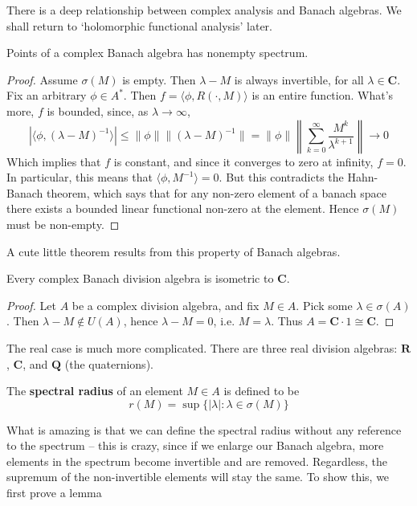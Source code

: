 There is a deep relationship between complex analysis and Banach algebras. We shall return to `holomorphic functional analysis' later.

\begin{theorem}
    Points of a complex Banach algebra has nonempty spectrum.
\end{theorem}
\begin{proof}
    Assume $\sigma(M)$ is empty. Then $\lambda - M$ is always invertible, for all $\lambda \in \mathbf{C}$. Fix an arbitrary $\phi \in A^*$. Then $f = \langle \phi, R(\cdot, M) \rangle$ is an entire function. What's more, $f$ is bounded, since, as $\lambda \to \infty$,
    \[ | \langle \phi, (\lambda - M)^{-1} \rangle | \leq \| \phi \| \| (\lambda - M)^{-1} \| = \| \phi \| \left\| \sum_{k = 0}^\infty \frac{M^k}{\lambda^{k+1}} \right\| \to 0 \]
    Which implies that $f$ is constant, and since it converges to zero at infinity, $f = 0$. In particular, this means that $\langle \phi, M^{-1} \rangle = 0$. But this contradicts the Hahn-Banach theorem, which says that for any non-zero element of a banach space there exists a bounded linear functional non-zero at the element. Hence $\sigma(M)$ must be non-empty.
\end{proof}

A cute little theorem results from this property of Banach algebras.

\begin{corollary}
    Every complex Banach division algebra is isometric to $\mathbf{C}$.
\end{corollary}
\begin{proof}
    Let $A$ be a complex division algebra, and fix $M \in A$. Pick some $\lambda \in \sigma(A)$. Then $\lambda - M \not \in U(A)$, hence $\lambda - M = 0$, i.e. $M = \lambda$. Thus $A = \mathbf{C} \cdot 1 \cong \mathbf{C}$.
\end{proof}

The real case is much more complicated. There are three real division algebras: $\mathbf{R}$, $\mathbf{C}$, and $\mathbf{Q}$ (the quaternions).

\begin{definition}
    The {\bf spectral radius} of an element $M \in A$ is defined to be
    \[ r(M) = \sup \{ |\lambda| : \lambda \in \sigma(M) \} \]
\end{definition}

What is amazing is that we can define the spectral radius without any reference to the spectrum -- this is crazy, since if we enlarge our Banach algebra, more elements in the spectrum become invertible and are removed. Regardless, the supremum of the non-invertible elements will stay the same. To show this, we first prove a lemma

